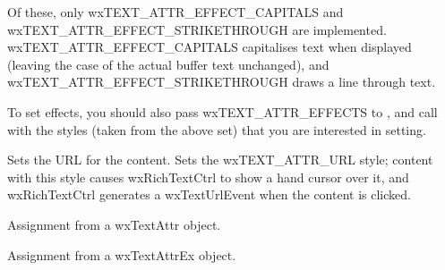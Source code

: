 Of these, only wxTEXT\_ATTR\_EFFECT\_CAPITALS and wxTEXT\_ATTR\_EFFECT\_STRIKETHROUGH are implemented.
wxTEXT\_ATTR\_EFFECT\_CAPITALS capitalises text when displayed (leaving the case of the actual buffer
text unchanged), and wxTEXT\_ATTR\_EFFECT\_STRIKETHROUGH draws a line through text.

To set effects, you should also pass wxTEXT\_ATTR\_EFFECTS to , and call\rtfsp
{} with the styles (taken from the
above set) that you are interested in setting.

\label{wxtextattrexseturl}


Sets the URL for the content. Sets the wxTEXT\_ATTR\_URL style; content with this style
causes wxRichTextCtrl to show a hand cursor over it, and wxRichTextCtrl generates
a wxTextUrlEvent when the content is clicked.

\label{wxtextattrexoperatorassign}


Assignment from a wxTextAttr object.


Assignment from a wxTextAttrEx object.


